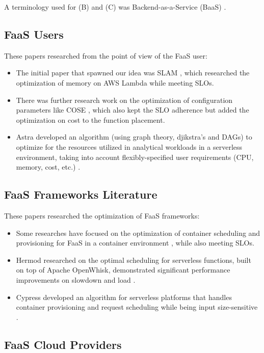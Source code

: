\documentclass[conference]{IEEEtran}
\begin{document}
A terminology used for (B) and (C) was Backend-as-a-Service (BaaS) \cite{10.1145/3464298.3493398}.

\subsection{FaaS Users}

These papers researched from the point of view of the FaaS user:
\begin{itemize}
    \item The initial paper that spawned our idea was SLAM \cite{9860980}, which researched the optimization of memory on AWS Lambda while meeting SLOs.
    \item There was further research work on the optimization of configuration parameters like COSE \cite{10063937}, which also kept the SLO adherence but added the optimization on cost to the function placement.
    \item Astra developed an algorithm (using graph theory, djikstra's and DAGs) to optimize for the resources utilized in analytical workloads in a serverless environment, taking into account flexibly-specified user requirements (CPU, memory, cost, etc.) \cite{9460548} .
\end{itemize}

\subsection{FaaS Frameworks Literature}

These papers researched the optimization of FaaS frameworks:
\begin{itemize}
    \item Some researches have focused on the optimization of container scheduling and provisioning for FaaS in a container environment \cite{10.1145/3472883.3486992}, while also meeting SLOs.
    \item Hermod researched on the optimal scheduling for serverless functions, built on top of Apache OpenWhisk, demonstrated significant performance improvements on slowdown and load \cite{10.1145/3542929.3563468}.
    \item Cypress developed an algorithm for serverless platforms that handles container provisioning and request scheduling while being input size-sensitive \cite{10.1145/3542929.3563464} .
\end{itemize}

\subsection{FaaS Cloud Providers}
\end{document}
